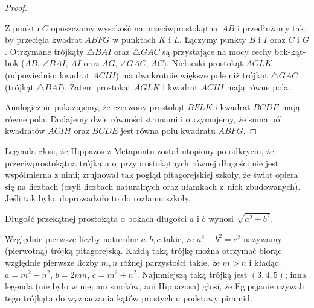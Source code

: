 \begin{proof}
\begin{center}
\begin{comment}
        \tkzDefSquare(C,B)
        \tkzGetPoints{E}{D}
        \tkzDrawPolygon[line width=0.3mm,fill=red!40](C,B,E,D)
        \tkzLabelPoint[above](D){$D$}
        \tkzLabelPoint[below](E){$E$}
        \tkzDefSquare(A,C)
        \tkzGetPoints{H}{I}
        \tkzDrawPolygon[line width=0.3mm, fill=blue!40](A,C,H,I)
        \tkzLabelPoint[above right](H){$H$}
        \tkzLabelPoint[above right](I){$I$}
        \tkzDrawSegments[line width=0.2mm](C,G)
        \tkzDrawSegments[line width=0.2mm, dashed](C,K)
        \tkzDrawSegments[line width=0.2mm](I,B)
        \tkzDrawPolygon[line width=0.5mm](A,B,C)
    \end{tikzpicture}
\end{comment}
    \end{center}
    Z punktu $C$ opuszczamy wysokość na przeciwprostokątną $AB$ i przedłużamy tak, by przecięła kwadrat $ABFG$ w punktach $K$ i $L$.
    Łączymy punkty $B$ i $I$ oraz $C$ i $G$.
    Otrzymane trójkąty $\triangle BAI$ oraz $\triangle GAC$ są przystające na mocy cechy bok-kąt-bok ($AB$, $\angle BAI$, $AI$ oraz $AG$, $\angle GAC$, $AC$).
    Niebieski prostokąt $AGLK$ (odpowiednio: kwadrat $ACHI$) ma dwukrotnie większe pole niż trójkąt $\triangle GAC$ (trójkąt $\triangle BAI$).
    Zatem prostokąt $AGLK$ i kwadrat $ACHI$ mają równe pola.
    
    Analogicznie pokazujemy, że czerwony prostokąt $BFLK$ i kwadrat $BCDE$ mają równe pola.
    Dodajemy dwie równości stronami i otrzymujemy, że suma pól kwadratów $ACIH$ oraz $BCDE$ jest równa polu kwadratu $ABFG$.
\end{proof}

Legenda głosi, że Hippazos z Metapontu został utopiony po odkryciu, że przeciwprostokątna trójkąta o~przyprostokątnych równej długości nie jest współmierna z nimi; zrujnował tak pogląd pitagorejskiej szkoły, że świat opiera się na liczbach (czyli liczbach naturalnych oraz ułamkach z~nich zbudowanych).
Jeśli tak było, doprowadziło to do rozłamu szkoły.

\begin{corollary}
    Długość przekątnej prostokąta o bokach długości $a$ i $b$ wynosi $\sqrt{a^2 + b^2}$.
\end{corollary}

Względnie pierwsze liczby naturalne $a, b, c$ takie, że $a^2 + b^2 = c^2$ nazywamy (pierwotną) trójką pitagorejską.
Każdą taką trójkę można otrzymać biorąc względnie pierwsze liczby $m, n$ różnej parzystości takie, że $m > n$ i kładąc $a = m^2 - n^2$, $b = 2 mn$, $c = m^2 + n^2$.
Najmniejszą taką trójką jest $(3, 4, 5)$; inna legenda (nie było w niej ani smoków, ani Hippazosa) głosi, że Egipcjanie używali tego trójkąta do wyznaczania kątów prostych u podstawy piramid.

